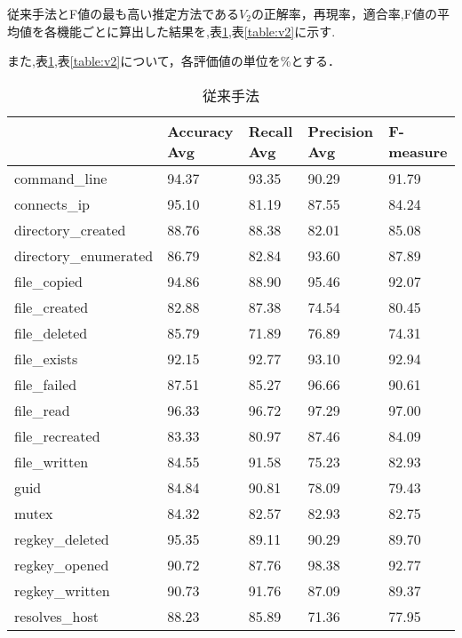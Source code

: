 \documentclass{thesis}
\begin{document}
従来手法とF値の最も高い推定方法である$V_2$の正解率，再現率，適合率,F値の平均値を各機能ごとに算出した結果を,表\ref{table:従来手法},表\ref{table:v2}に示す.

また,表\ref{table:従来手法},表\ref{table:v2}について，各評価値の単位を\%とする．
\begin{table}[H]
	\caption{従来手法}
	\label{table:従来手法}
	\begin{center}
		\begin{tabular}{|l||p{24mm}|p{24mm}|p{24mm}|p{24mm}|} \hline
			 & Accuracy Avg & Recall Avg & Precision Avg & F-measure \\ \hline \hline
			command\_line &94.37&93.35&90.29&91.79 \\ \hline
			connects\_ip &95.10&81.19&87.55&84.24 \\ \hline
			directory\_created &88.76&88.38&82.01&85.08 \\ \hline
			directory\_enumerated &86.79&82.84&93.60&87.89 \\ \hline
                  file\_copied  &94.86&88.90&95.46&92.07 \\ \hline
                   file\_created &82.88&87.38&74.54&80.45 \\ \hline
                   file\_deleted &85.79&71.89&76.89&74.31 \\ \hline
                  file\_exists&92.15&92.77&93.10&92.94 \\ \hline
                   file\_failed &87.51&85.27&96.66&90.61 \\ \hline
                  file\_read&96.33&96.72&97.29&97.00 \\ \hline
                  file\_recreated &83.33&80.97&87.46&84.09 \\ \hline
                  file\_written &84.55&91.58&75.23&82.93 \\ \hline
                   guid &84.84&90.81&78.09&79.43 \\ \hline
                  mutex &84.32&82.57&82.93&82.75 \\ \hline
                  regkey\_deleted&95.35&89.11&90.29&89.70 \\ \hline
                  regkey\_opened  &90.72&87.76&98.38&92.77 \\ \hline
                  regkey\_written &90.73&91.76&87.09&89.37 \\ \hline
                   resolves\_host &88.23&85.89&71.36&77.95 \\ \hline
		\end{tabular}
	\end{center}
\end{table}
\end{document}
